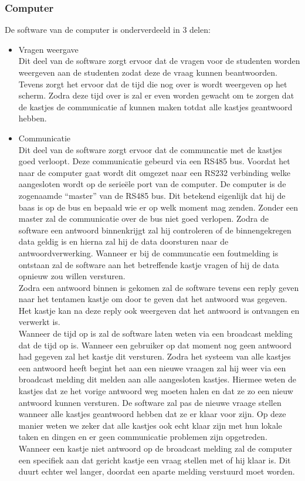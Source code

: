 \documentclass[a4paper,titlepage]{artikel1}
\begin{document}
\subsubsection{Computer}
De software van de computer is onderverdeeld in 3 delen:
\begin{itemize}
  \item Vragen weergave \\
    Dit deel van de software zorgt ervoor dat de vragen voor de studenten worden weergeven aan de studenten zodat deze de vraag kunnen beantwoorden. Tevens zorgt het ervoor dat de tijd die nog over is wordt weergeven op het scherm. Zodra deze tijd over is zal er even worden gewacht om te zorgen dat de kastjes de communicatie af kunnen maken totdat alle kastjes geantwoord hebben.
  \item Communicatie \\
    Dit deel van de software zorgt ervoor dat de communcatie met de kastjes goed verloopt. Deze communicatie gebeurd via een RS485 bus. Voordat het naar de computer gaat wordt dit omgezet naar een RS232 verbinding welke aangesloten wordt op de serie\"{e}le port van de computer. De computer is de zogenaamde ``master'' van de RS485 bus. Dit betekend eigenlijk dat hij de baas is op de bus en bepaald wie er op welk moment mag zenden. Zonder een master zal de communicatie over de bus niet goed verlopen. Zodra de software een antwoord binnenkrijgt zal hij controleren of de binnengekregen data geldig is en hierna zal hij de data doorsturen naar de antwoordverwerking. Wanneer er bij de communcatie een foutmelding is ontstaan zal de software aan het betreffende kastje vragen of hij de data opnieuw zou willen versturen. \\
    Zodra een antwoord binnen is gekomen zal de software tevens een reply geven naar het tentamen kastje om door te geven dat het antwoord was gegeven. Het kastje kan na deze reply ook weergeven dat het antwoord is ontvangen en verwerkt is. \\
    Wanneer de tijd op is zal de software laten weten via een broadcast melding dat de tijd op is. Wanneer een gebruiker op dat moment nog geen antwoord had gegeven zal het kastje dit versturen. Zodra het systeem van alle kastjes een antwoord heeft begint het aan een nieuwe vraagen zal hij weer via een broadcast melding dit melden aan alle aangesloten kastjes. Hiermee weten de kastjes dat ze het vorige antwoord weg moeten halen en dat ze zo een nieuw antwoord kunnen versturen. De software zal pas de nieuwe vraage stellen wanneer alle kastjes geantwoord hebben dat ze er klaar voor zijn. Op deze manier weten we zeker dat alle kastjes ook echt klaar zijn met hun lokale taken en dingen en er geen communicatie problemen zijn opgetreden. Wanneer een kastje niet antwoord op de broadcast melding zal de computer een specifiek aan dat gericht kastje een vraag stellen met of hij klaar is. Dit duurt echter wel langer, doordat een aparte melding verstuurd moet worden.

\end{itemize}
\end{document}
